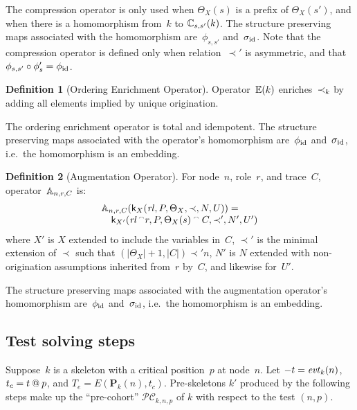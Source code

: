 \documentclass[12pt]{article}
\theoremstyle{definition}
\newtheorem{defn}{Definition}[section]
\newcommand{\pubmsg}{\mathbf{P}}
\newcommand{\evt}{\fn{evt}}
\newcommand{\skel}{\mathsf{k}}
\newcommand{\rl}{\fn{rl}}
\begin{document}
The compression operator is only used when $\Theta_X(s)$ is a prefix
of $\Theta_X(s')$, and when there is a homomorphism from~$k$ to
$\mathbb C_{s,s'}(k)$.  The structure preserving maps associated with
the homomorphism are~$\phi_{s,s'}$ and~$\sigma_{\mathrm{id}}$.  Note that the
compression operator is defined only when relation~$\prec'$ is
asymmetric, and that ${\mathord{\phi_{s,s'}}}\circ{\mathord{\phi'_s}}=\phi_{\mathrm{id}}$.

\begin{defn}[Ordering Enrichment Operator]
Operator~$\mathbb E(k)$ enriches~$\mathbin{\prec_{k}}$ by adding all elements implied
by unique origination.
\end{defn}
The ordering enrichment operator is total and idempotent.  The
structure preserving maps associated with the operator's homomorphism
are~$\phi_{\mathrm{id}}$ and~$\sigma_{\mathrm{id}}$, i.e.\ the homomorphism is an embedding.

\begin{defn}[Augmentation Operator]
For node~$n$, role~$r$, and trace~$C$, operator~$\mathbb A_{n,r,C}$ is:
$$\begin{array}{l}
\ops{A}_{n,r,C}(\skel_X(\rl,P,\Theta_X,\prec,N,U)) = {}\\
\quad\skel_{X'}(\rl\append r,P,
\Theta_X(s)\append C,\prec',N',U')
\end{array}$$
where $X'$ is $X$ extended to include the variables in~$C$,
$\prec'$ is the minimal extension of $\prec$ such that
$(|\Theta_X|+1,|C|)\prec' n$, $N'$ is $N$ extended with
non-origination assumptions inherited from~$r$ by~$C$, and likewise
for~$U'$.
\end{defn}

The structure preserving maps associated with the augmentation
operator's homomorphism are~$\phi_{\mathrm{id}}$ and~$\sigma_{\mathrm{id}}$, i.e.\ the
homomorphism is an embedding.

\subsection{Test solving steps}

Suppose~$k$ is a skeleton with a critical position~$p$ at node~$n$.
Let $\inbnd t=\evt_k(n)$, $t_c=t\mathbin{@} p$, and $T_e=E(\pubmsg_k(n),
t_c)$.  Pre-skeletons $k'$ produced by the following steps make up the
``pre-cohort'' $\mathcal{PC}_{k,n,p}$ of $k$ with respect to the test $(n,p)$.
\end{document}
